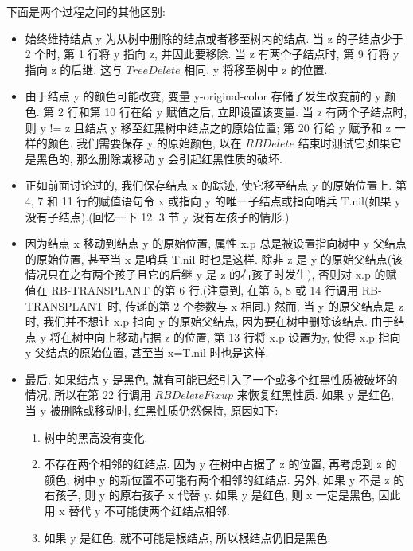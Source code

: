 \documentclass[oneside,10pt,fontset=none]{ctexbook}
\numberwithin{definition}{chapter}
\numberwithin{theorem}{chapter}
\numberwithin{lemma}{chapter}
\begin{document}
下面是两个过程之间的其他区别:
\begin{itemize}
    \item 始终维持结点 y 为从树中删除的结点或者移至树内的结点. 当 z 的子结点少于 2 个时, 第 1 行将 y 指向 z, 并因此要移除. 当 z 有两个子结点时, 第 9 行将 y 指向 z 的后继, 这与 $TreeDelete$ 相同, y 将移至树中 z 的位置.
    \item 由于结点 y 的颜色可能改变, 变量 y-original-color 存储了发生改变前的 y 颜色. 第 2 行和第 10 行在给 y 赋值之后, 立即设置该变量. 当 z 有两个子结点时, 则 y != z 且结点 y 移至红黑树中结点之的原始位置; 第 20 行给 y 赋予和 z 一样的颜色. 我们需要保存 y 的原始颜色, 以在 $RBDelete$ 结束时测试它;如果它是黑色的, 那么删除或移动 y 会引起红黑性质的破坏.
    \item 正如前面讨论过的, 我们保存结点 x 的踪迹, 使它移至结点 y 的原始位置上. 第 4, 7 和 11 行的赋值语句令 x 或指向 y 的唯一子结点或指向哨兵 T.nil(如果 y 没有子结点).(回忆一下 12. 3 节 y 没有左孩子的情形.)
    \item 因为结点 x 移动到结点 y 的原始位置, 属性 x.p 总是被设置指向树中 y 父结点的原始位置, 甚至当 x 是哨兵 T.nil 时也是这样. 除非 z 是 y 的原始父结点(该情况只在之有两个孩子且它的后继 y 是 z 的右孩子时发生), 否则对 x.p 的赋值在 RB-TRANSPLANT 的第 6 行.(注意到, 在第 5, 8 或 14 行调用 RB-TRANSPLANT 时, 传递的第 2 个参数与 x 相同.) 然而, 当 y 的原父结点是 z 时, 我们并不想让 x.p 指向 y 的原始父结点, 因为要在树中删除该结点. 由于结点 y 将在树中向上移动占据 z 的位置, 第 13 行将 x.p 设置为y, 使得 x.p 指向 y 父结点的原始位置, 甚至当 x=T.nil 时也是这样.
    \item 最后, 如果结点 y 是黑色, 就有可能已经引入了一个或多个红黑性质被破坏的情况, 所以在第 22 行调用 $RBDeleteFixup$ 来恢复红黑性质. 如果 y 是红色, 当 y 被删除或移动时, 红黑性质仍然保持, 原因如下:
    
    \begin{enumerate}
        \item 树中的黑高没有变化.
        \item 不存在两个相邻的红结点. 因为 y 在树中占据了 z 的位置, 再考虑到 z 的颜色, 树中 y 的新位置不可能有两个相邻的红结点. 另外, 如果 y 不是 z 的右孩子, 则 y 的原右孩子 x 代替 y. 如果 y 是红色, 则 x 一定是黑色, 因此用 x 替代 y 不可能使两个红结点相邻.
        \item 如果 y 是红色, 就不可能是根结点, 所以根结点仍旧是黑色.
    \end{enumerate}
\end{itemize}
\end{document}

